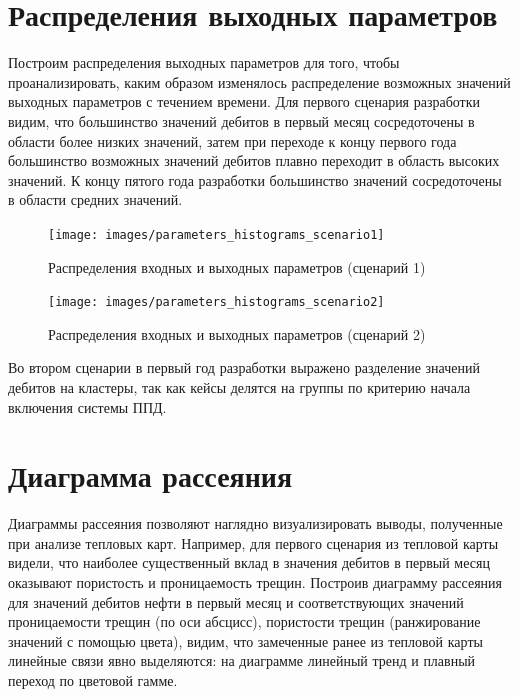 \section{Распределения выходных параметров} \label{ch1:sec2}
Построим распределения выходных параметров для того, чтобы проанализировать, каким образом изменялось распределение возможных значений выходных параметров с течением времени. Для первого сценария разработки видим, что большинство значений дебитов в первый месяц сосредоточены в области более низких значений, затем при переходе к концу первого года большинство возможных значений дебитов плавно переходит в область высоких значений. К концу пятого года разработки большинство значений сосредоточены в области средних значений.

\begin{figure}[H] 
	\center
	\texttt{[image: images/parameters\_histograms\_scenario1]}
	\caption{Распределения входных и выходных параметров (сценарий 1)} 
	\label{fig:histograms-1}
\end{figure}

\begin{figure}[H] 
	\center
	\texttt{[image: images/parameters\_histograms\_scenario2]}
	\caption{Распределения входных и выходных параметров (сценарий 2)} 
	\label{fig:histograms-2}
\end{figure}

Во втором сценарии в первый год разработки выражено разделение значений дебитов на кластеры, так как кейсы делятся на группы по критерию начала включения системы ППД.

\section{Диаграмма рассеяния} \label{ch1:sec3}
Диаграммы рассеяния позволяют наглядно визуализировать выводы, полученные при анализе тепловых карт. Например, для первого сценария из тепловой карты видели, что наиболее существенный вклад в значения дебитов в первый месяц оказывают пористость и проницаемость трещин.
Построив диаграмму рассеяния для значений дебитов нефти в первый месяц и соответствующих значений проницаемости трещин (по оси абсцисс), пористости трещин (ранжирование значений с помощью цвета), видим, что замеченные ранее из тепловой карты линейные связи явно выделяются: на диаграмме линейный тренд и плавный переход по цветовой гамме.

